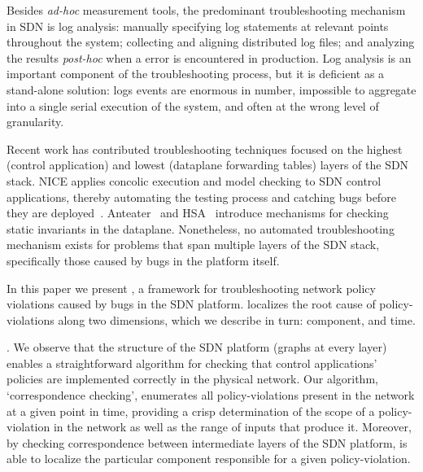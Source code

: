 Besides {\it ad-hoc} measurement tools,
the predominant troubleshooting mechanism in SDN is
log analysis: manually specifying log statements at relevant points throughout the system;
collecting and aligning distributed log files; and analyzing the
results {\it post-hoc} when a error is encountered in production. Log analysis
is an important component of the troubleshooting process, but it is deficient
as a stand-alone solution: logs events
are enormous in number, impossible to aggregate into a single serial
execution of the system, and often at the wrong level of granularity.

Recent work has contributed troubleshooting techniques focused on the highest (control
application) and lowest (dataplane forwarding tables) layers of the SDN stack.
NICE applies concolic execution and model checking to SDN control
applications, thereby automating the testing process and catching bugs before
they are deployed~\cite{nice}. Anteater~\cite{anteater} and HSA~\cite{hsa}
introduce mechanisms for checking static invariants in the dataplane.
Nonetheless, no automated troubleshooting mechanism exists for problems that span
multiple layers of the SDN stack, specifically those caused by bugs in the platform
itself.


In this paper we present \projectname{}, a framework for troubleshooting
network policy violations caused by bugs in the
SDN platform. \projectname{} localizes the root cause
of policy-violations along two dimensions, which we describe in turn:
component, and time.

. We observe that the structure of the
SDN platform (graphs at every layer) enables a straightforward algorithm for
checking that control applications' policies are implemented correctly in
the physical network. Our algorithm, `correspondence checking',
enumerates all policy-violations present in the network at a given point in
time, providing a crisp determination of the scope of a policy-violation in the
network as well as the range of inputs that produce it. Moreover,
by checking correspondence between intermediate layers of the
SDN platform, \projectname{} is able to localize the particular component responsible 
for a given policy-violation.

